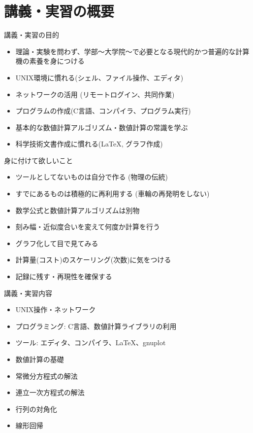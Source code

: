 \section{講義・実習の概要}

\begin{frame}[t]{講義・実習の目的}
  \begin{itemize}
  \item 理論・実験を問わず、学部〜大学院〜で必要となる現代的かつ普遍的な計算機の素養を身につける
  \item UNIX環境に慣れる(シェル、ファイル操作、エディタ)
  \item ネットワークの活用 (リモートログイン、共同作業)
  \item プログラムの作成(C言語、コンパイラ、プログラム実行)
  \item 基本的な数値計算アルゴリズム・数値計算の常識を学ぶ
  \item 科学技術文書作成に慣れる(\LaTeX, グラフ作成)
  \end{itemize}
\end{frame}

\begin{frame}[t]{身に付けて欲しいこと}
  \begin{itemize}
  \item ツールとしてないものは自分で作る (物理の伝統)
  \item すでにあるものは積極的に再利用する (車輪の再発明をしない)
  \item 数学公式と数値計算アルゴリズムは別物
  \item 刻み幅・近似度合いを変えて何度か計算を行う
  \item グラフ化して目で見てみる
  \item 計算量(コスト)のスケーリング(次数)に気をつける
  \item 記録に残す・再現性を確保する
  \end{itemize}
\end{frame}

\begin{frame}[t]{講義・実習内容}
  \begin{itemize}
  \item UNIX操作・ネットワーク
  \item プログラミング: C言語、数値計算ライブラリの利用
  \item ツール: エディタ、コンパイラ、\LaTeX、gnuplot
  \item 数値計算の基礎
  \item 常微分方程式の解法
  \item 連立一次方程式の解法
  \item 行列の対角化
  \item 線形回帰
  \end{itemize}
\end{frame}

